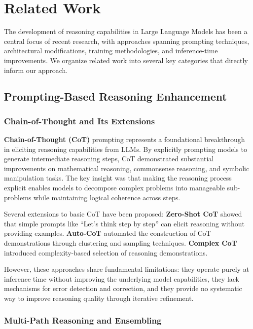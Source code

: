 \documentclass[10pt,twocolumn]{article}
\begin{document}
\section{Related Work} \label{sec:related_work}

The development of reasoning capabilities in Large Language Models has been a central focus of recent research, with approaches spanning prompting techniques, architectural modifications, training methodologies, and inference-time improvements. We organize related work into several key categories that directly inform our approach.

\subsection{Prompting-Based Reasoning Enhancement}

\subsubsection{Chain-of-Thought and Its Extensions}

\textbf{Chain-of-Thought (CoT)} prompting \cite{wei2022chain} represents a foundational breakthrough in eliciting reasoning capabilities from LLMs. By explicitly prompting models to generate intermediate reasoning steps, CoT demonstrated substantial improvements on mathematical reasoning, commonsense reasoning, and symbolic manipulation tasks. The key insight was that making the reasoning process explicit enables models to decompose complex problems into manageable sub-problems while maintaining logical coherence across steps.

Several extensions to basic CoT have been proposed: \textbf{Zero-Shot CoT} \cite{kojima2022large} showed that simple prompts like ``Let's think step by step'' can elicit reasoning without providing examples. \textbf{Auto-CoT} \cite{zhang2022automatic} automated the construction of CoT demonstrations through clustering and sampling techniques. \textbf{Complex CoT} \cite{fu2022complexity} introduced complexity-based selection of reasoning demonstrations.

However, these approaches share fundamental limitations: they operate purely at inference time without improving the underlying model capabilities, they lack mechanisms for error detection and correction, and they provide no systematic way to improve reasoning quality through iterative refinement.

\subsubsection{Multi-Path Reasoning and Ensembling}
\end{document}
